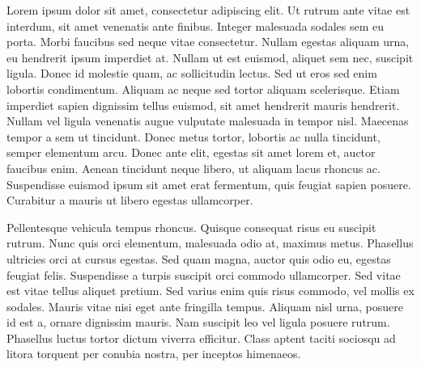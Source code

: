 Lorem ipsum dolor sit amet, consectetur adipiscing elit. Ut rutrum ante vitae est interdum, sit amet venenatis ante finibus. Integer malesuada sodales sem eu porta. Morbi faucibus sed neque vitae consectetur. Nullam egestas aliquam urna, eu hendrerit ipsum imperdiet at. Nullam ut est euismod, aliquet sem nec, suscipit ligula. Donec id molestie quam, ac sollicitudin lectus. Sed ut eros sed enim lobortis condimentum. Aliquam ac neque sed tortor aliquam scelerisque. Etiam imperdiet sapien dignissim tellus euismod, sit amet hendrerit mauris hendrerit. Nullam vel ligula venenatis augue vulputate malesuada in tempor nisl. Maecenas tempor a sem ut tincidunt. Donec metus tortor, lobortis ac nulla tincidunt, semper elementum arcu. Donec ante elit, egestas sit amet lorem et, auctor faucibus enim. Aenean tincidunt neque libero, ut aliquam lacus rhoncus ac. Suspendisse euismod ipsum sit amet erat fermentum, quis feugiat sapien posuere. Curabitur a mauris ut libero egestas ullamcorper.

Pellentesque vehicula tempus rhoncus. Quisque consequat risus eu suscipit rutrum. Nunc quis orci elementum, malesuada odio at, maximus metus. Phasellus ultricies orci at cursus egestas. Sed quam magna, auctor quis odio eu, egestas feugiat felis. Suspendisse a turpis suscipit orci commodo ullamcorper. Sed vitae est vitae tellus aliquet pretium. Sed varius enim quis risus commodo, vel mollis ex sodales. Mauris vitae nisi eget ante fringilla tempus. Aliquam nisl urna, posuere id est a, ornare dignissim mauris. Nam suscipit leo vel ligula posuere rutrum. Phasellus luctus tortor dictum viverra efficitur. Class aptent taciti sociosqu ad litora torquent per conubia nostra, per inceptos himenaeos.

